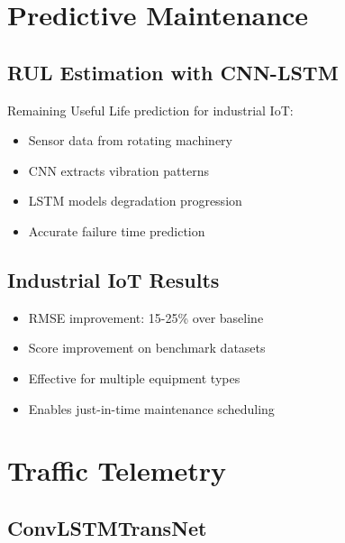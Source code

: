 \documentclass[12pt,a4paper]{article}
\begin{document}
\section{Predictive Maintenance}

\subsection{RUL Estimation with CNN-LSTM}

Remaining Useful Life prediction for industrial IoT:
\begin{itemize}
    \item Sensor data from rotating machinery
    \item CNN extracts vibration patterns
    \item LSTM models degradation progression
    \item Accurate failure time prediction
\end{itemize}

\subsection{Industrial IoT Results}

\begin{tcolorbox}[colback=lstmgreen!10, colframe=lstmgreen, title=RUL Estimation Results]
\begin{itemize}
    \item RMSE improvement: 15-25\% over baseline
    \item Score improvement on benchmark datasets
    \item Effective for multiple equipment types
    \item Enables just-in-time maintenance scheduling
\end{itemize}
\end{tcolorbox}

\section{Traffic Telemetry}

\subsection{ConvLSTMTransNet}
\end{document}
